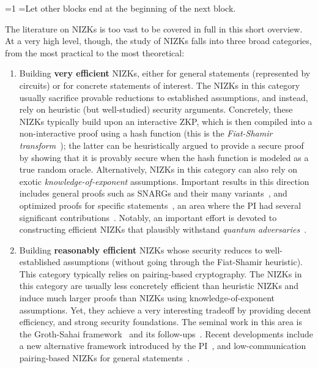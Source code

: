 \documentclass[oneside, a4paper, onecolumn, 11pt]{article}
\newcounter{alphasect}
\def\alphainsection{0}
\newenvironment{alphasection}{%
  \ifnum\alphainsection=1%
    \errhelp={Let other blocks end at the beginning of the next block.}
    \errmessage{Nested Alpha section not allowed}
  \fi%
  \setcounter{alphasect}{0}
  \def\alphainsection{1}
}{%
  \setcounter{alphasect}{0}
  \def\alphainsection{0}
}%
\begin{document}
\begin{alphasection}
The literature on NIZKs is too vast to be covered in full in this short overview. At a very high level, though, the study of NIZKs falls into three broad categories, from the most practical to the most theoretical:

\begin{enumerate}[wide, labelwidth=!, labelindent=0pt]
    \item Building \textbf{very efficient} NIZKs, either for general statements (represented by circuits) or for concrete statements of interest. The NIZKs in this category usually sacrifice provable reductions to established assumptions, and instead, rely on heuristic (but well-studied) security arguments. Concretely, these NIZKs typically build upon an interactive ZKP, which is then compiled into a non-interactive proof using a hash function (this is the \emph{Fiat-Shamir transform}~\cite{C:FiaSha86}); the latter can be heuristically argued to provide a secure proof by showing that it is provably secure when the hash function is modeled as a true random oracle. Alternatively, NIZKs in this category can also rely on exotic \emph{knowledge-of-exponent} assumptions. Important results in this direction includes general proofs such as SNARGs and their many variants~\cite{SP:BBBPWM18,CCS:MBKM19,C:Setty20}, and optimized proofs for specific statements~\cite{EC:BayGro13,EC:GroKoh15,CCS:KatKolWan18}, an area where the PI had several significant contributions~\cite{EC:CouPetPoi17,EC:CKLR21,CCS:CGKR22}. Notably, an important effort is devoted to constructing efficient NIZKs that plausibly withstand \emph{quantum adversaries}~\cite{CCS:KatKolWan18,PKC:BdKOSZ21,C:FenJouRiv22}.
    \item Building \textbf{reasonably efficient} NIZKs whose security reduces to well-established assumptions (without going through the Fiat-Shamir heuristic). This category typically relies on pairing-based cryptography. The NIZKs in this category are usually less concretely efficient than heuristic NIZKs and induce much larger proofs than NIZKs using knowledge-of-exponent assumptions. Yet, they achieve a very interesting tradeoff by providing decent efficiency, and strong security foundations. The seminal work in this area is the Groth-Sahai framework~\cite{EC:GroSah08} and its follow-ups~\cite{ACNS:BFIJSV10,PKC:EscGro14,TCC:Rafols15,PKC:DGPRS19}. Recent developments include a new alternative framework introduced by the PI~\cite{C:CouHar20,AC:CLPO21}, and low-communication pairing-based NIZKs for general statements~\cite{STOC:KalPanYan19, C:WatWu22}.

\end{enumerate}
\end{alphasection}
\end{document}
